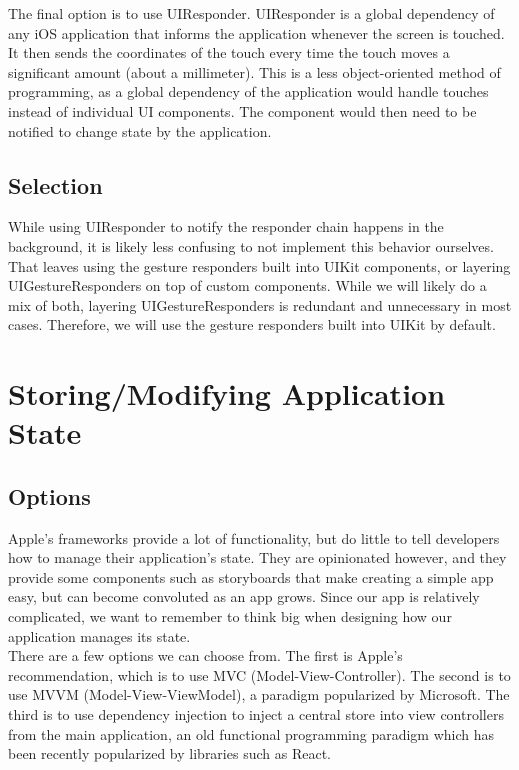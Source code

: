 \documentclass[letterpaper,10pt,titlepage]{article}
\begin{document}
The final option is to use UIResponder. UIResponder is a global dependency of any iOS application that informs the application whenever the screen is touched. It then sends the coordinates of the touch every time the touch moves a significant amount (about a millimeter). This is a less object-oriented method of programming, as a global dependency of the application would handle touches instead of individual UI components. The component would then need to be notified to change state by the application.

\subsection{Selection}
While using UIResponder to notify the responder chain happens in the background, it is likely less confusing to not implement this behavior ourselves. That leaves using the gesture responders built into UIKit components, or layering UIGestureResponders on top of custom components. While we will likely do a mix of both, layering UIGestureResponders is redundant and unnecessary in most cases. Therefore, we will use the gesture responders built into UIKit by default.

\section{Storing/Modifying Application State}
\subsection{Options}
Apple's frameworks provide a lot of functionality, but do little to tell developers how to manage their application's state. They are opinionated however, and they provide some components such as storyboards that make creating a simple app easy, but can become convoluted as an app grows. Since our app is relatively complicated, we want to remember to think big when designing how our application manages its state.\\

There are a few options we can choose from. The first is Apple's recommendation, which is to use MVC (Model-View-Controller). The second is to use MVVM  (Model-View-ViewModel), a paradigm popularized by Microsoft. The third is to use dependency injection to inject a central store into view controllers from the main application, an old functional programming paradigm which has been recently popularized by libraries such as React.
\end{document}
